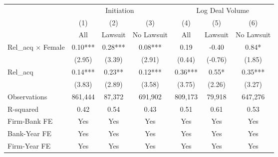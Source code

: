 {
\def\sym#1{\ifmmode^{#1}\else\(^{#1}\)\fi}
\begin{tabular*}{\hsize}{@{\hskip\tabcolsep\extracolsep\fill}l*{6}{c}}
\toprule
                &\multicolumn{3}{c}{Initiation}        &\multicolumn{3}{c}{Log Deal Volume}   \\\cmidrule(lr){2-4}\cmidrule(lr){5-7}
                &\multicolumn{1}{c}{(1)}&\multicolumn{1}{c}{(2)}&\multicolumn{1}{c}{(3)}&\multicolumn{1}{c}{(4)}&\multicolumn{1}{c}{(5)}&\multicolumn{1}{c}{(6)}\\
                &\multicolumn{1}{c}{All}&\multicolumn{1}{c}{Lawsuit}&\multicolumn{1}{c}{No Lawsuit}&\multicolumn{1}{c}{All}&\multicolumn{1}{c}{Lawsuit}&\multicolumn{1}{c}{No Lawsuit}\\
\midrule
Rel\_acq $\times$ Female&     0.10***&     0.28***&     0.08***&     0.19   &    -0.40   &     0.84*  \\
                &   (2.95)   &   (3.39)   &   (2.91)   &   (0.44)   &  (-0.76)   &   (1.85)   \\
 
Rel\_acq&     0.14***&     0.23** &     0.12***&     0.36***&     0.55*  &     0.35***\\
                &   (3.83)   &   (2.89)   &   (3.58)   &   (3.75)   &   (2.26)   &   (3.27)   \\
\midrule
Observations    &  861,444   &   87,372   &  691,902   &  809,173   &   79,918   &  647,276   \\
R-squared       &     0.42   &     0.54   &     0.43   &     0.51   &     0.61   &     0.53   \\
\midrule Firm-Bank FE&      Yes   &      Yes   &      Yes   &      Yes   &      Yes   &      Yes   \\
Bank-Year FE    &      Yes   &      Yes   &      Yes   &      Yes   &      Yes   &      Yes   \\
Firm-Year FE    &      Yes   &      Yes   &      Yes   &      Yes   &      Yes   &      Yes   \\
\bottomrule
\end{tabular*}
}
